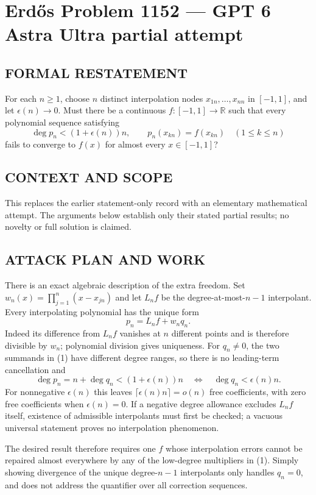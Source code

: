 \section*{Erd\H{o}s Problem 1152 --- GPT 6 Astra Ultra partial attempt}


\subsection*{FORMAL RESTATEMENT}
For each $n\geq1$, choose $n$ distinct interpolation nodes $x_{1n},\ldots,x_{nn}$ in $[-1,1]$, and let $\epsilon(n)\to0$. Must there be a continuous $f:[-1,1]\to\mathbb R$ such that every polynomial sequence satisfying
\[
\deg p_n<(1+\epsilon(n))n,\qquad p_n(x_{kn})=f(x_{kn})\quad(1\leq k\leq n)
\]
fails to converge to $f(x)$ for almost every $x\in[-1,1]$?

\subsection*{CONTEXT AND SCOPE}
This replaces the earlier statement-only record with an elementary mathematical attempt. The arguments below establish only their stated partial results; no novelty or full solution is claimed.

\subsection*{ATTACK PLAN AND WORK}
There is an exact algebraic description of the extra freedom. Set
$w_n(x)=\prod_{j=1}^n(x-x_{jn})$ and let $L_nf$ be the degree-at-most-$n-1$
interpolant. Every interpolating polynomial has the unique form
\[p_n=L_nf+w_nq_n.\tag{1}\]
Indeed its difference from $L_nf$ vanishes at $n$ different points and is therefore
divisible by $w_n$; polynomial division gives uniqueness.
For $q_n\ne0$, the two summands in (1) have different degree ranges, so there is
no leading-term cancellation and
\[\deg p_n=n+\deg q_n<(1+\epsilon(n))n
\quad\Longleftrightarrow\quad \deg q_n<\epsilon(n)n.\tag{2}\]
For nonnegative $\epsilon(n)$ this leaves $\lceil\epsilon(n)n\rceil=o(n)$ free
coefficients, with zero free coefficients when $\epsilon(n)=0$.
If a negative degree allowance excludes $L_nf$ itself, existence of admissible
interpolants must first be checked; a vacuous universal statement proves no
interpolation phenomenon.

The desired result therefore requires one $f$ whose interpolation errors cannot
be repaired almost everywhere by any of the low-degree multipliers in (1).
Simply showing divergence of the unique degree-$n-1$ interpolants only handles
$q_n=0$, and does not address the quantifier over all correction sequences.

